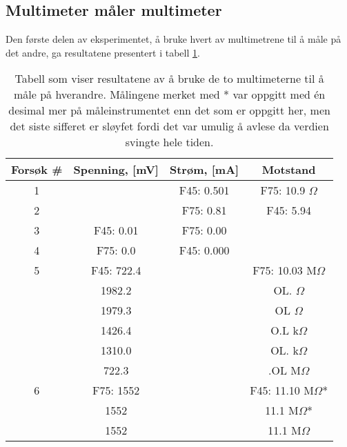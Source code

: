 \documentclass[reprint, english,notitlepage]{revtex4-1}  %
\begin{document}
\subsection{Multimeter måler multimeter}
Den første delen av eksperimentet, å bruke hvert av multimetrene til å måle på det andre, ga resultatene presentert i tabell \ref{table:multimetre}.

\begin{table}[p]
\label{table:multimetre}
\caption{Tabell som viser resultatene av å bruke de to multimeterne til å måle på hverandre. Målingene merket med * var oppgitt med én desimal mer på måleinstrumentet enn det som er oppgitt her, men det siste sifferet er sløyfet fordi det var umulig å avlese da verdien svingte hele tiden.}

\begin{adjustbox}{width=\linewidth}
\begin{tabular}{||c || c | c | c||}
\hline
Forsøk \# & Spenning, [mV] & Strøm, [mA] & Motstand  \\ \hline\hline
1 &            & F45: 0.501 & F75: 10.9 $\Omega$    \\ \hline
2 &            & F75: 0.81  & F45: 5.94             \\ \hline
3 & F45: 0.01  & F75: 0.00  &                       \\ \hline
4 & F75: 0.0   & F45: 0.000 &                       \\ \hline
5 & F45: 722.4 &            & F75: 10.03 M$\Omega$  \\ \hline
  &     1982.2 &            &        OL. $\Omega$   \\ \hline
  &     1979.3 &            &        OL $\Omega$    \\ \hline
  &     1426.4 &            &        O.L k$\Omega$  \\ \hline
  &     1310.0 &            &        OL. k$\Omega$  \\ \hline
  &      722.3 &            &        .OL  M$\Omega$ \\ \hline
6 & F75:  1552 &            & F45: 11.10 M$\Omega$*  \\ \hline
  &       1552 &            & 11.1 M$\Omega$*        \\ \hline
  &       1552 &            & 11.1 M$\Omega$         \\ \hline
\end{tabular}
\end{adjustbox}
\end{table}
\end{document}
